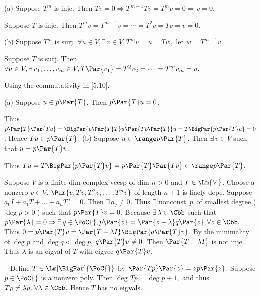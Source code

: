 
\par\quad
(a) Suppose $T^m$ is inje. Then $Tv=0\Rightarrow T^{m-1} Tv=T^m v=0\Rightarrow v=0.$\par\quad\Ha
Suppose $T$ is inje. Then $T^m v=T^{m-1}v=\cdots=T^2 v=Tv=v=0.$\par\vspace{4pt}\quad
(b) Suppose $T^m$ is surj. $\forall u\in V,\exists\,v\in V,T^m v=u=Tw,$ let $w=T^{m-1}v.$\par\quad\Hb
Suppose $T$ is surj. Then $\forall u\in V,\exists\,v_1,\dots,v_m\in V, T\Par{v_1}=T^2v_2=\cdots=T^m v_m=u.$\PfEnd
\SepLine

\BulletPointX\NoteFor{[5.17]}\TextB{}
\Solution Using the commutativity in [5.10].\par\quad
(a) Suppose $u\in\null p\Par{T}$. Then $p\Par{T}u = 0$.\par\quad\Ha
Thus $p\Par{T}\Par{Tu} = \BigPar{p\Par{T} T}u \Par{Tp\Par{T}}u=T\BigPar{p\Par{T}u} = 0$. Hence $Tu\in\null p\Par{T}.$\PfEnd\quad
(b) Suppose $u\in\range p\Par{T}$. Then $\exists\,v\in V$ such that $u = p\Par{T}v$.\par\quad\Hb
Thus $Tu = T\BigPar{p\Par{T}v} = p\Par{T}\Par{Tv}\in\range p\Par{T}.$\PfEnd
\SepLine

\BulletPointX\NoteFor{[5.21]} 
Suppose $V$ is a finite-dim complex vecsp of dim $n > 0$ and $T\in\Lm{V}$.\TextB{}
Choose a nonzero $v\in V$. $\Par{v,Tv,T^2 v,\dots,T^n v}$ of length $n+1$ is linely depe.\TextB{}
Suppose $a_0 I+a_1 T+\dots+a_n T^n=0.$ Then $\exists\,a_j\neq 0.$\TextB{}
{\tgsl Thus $\exists$ nonconst $\,p\,$ of smallest degree ( $\deg p>0$ ) such that $p\Par{T}v = 0$.}\TextB{}
Because $\exists\,\lambda \in \Cbb$ such that $p\Par{\lambda} = 0\Rightarrow\exists\,q \in\PoC{},p\Par{z} = \Par{z-\lambda}q\Par{z},\forall z \in\Cbb.$\TextB{}
Thus $0 = p\Par{T}v = \Par{T -\lambda I}\BigPar{q\Par{T}v}$. By the minimality of $\deg p$ and $\deg q<\deg p$, $q\Par{T}v \neq 0$.\TextB{}
Then $\Par{T-\lambda I}$ is not inje. Thus $\lambda$ is an eigval of $T$ with eigvec $q\Par{T}v$.\par
\BulletPointX\Example\,\,\, 
Define $T\in\Lm[\BigPar]{\PoC{}}$ by $\Par{Tp}\Par{z} = zp\Par{z}$.\TextB{}
Suppose $p\in\PoC{}$ is a nonzero poly. Then $\deg Tp=\deg p+1,$ and thus $Tp\neq\lambda p,\,\forall\lambda\in\Cbb.$\TextB{}
Hence $T$ has no eigvals.\par
\SepLine

